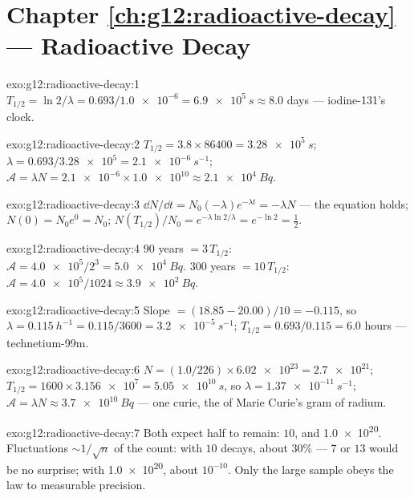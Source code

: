 \section*{Chapter \ref{ch:g12:radioactive-decay} --- Radioactive Decay}

\begin{solution}{exo:g12:radioactive-decay:1}
$T_{1/2} = \ln 2/\lambda = 0.693/\num{1.0e-6} = \qty{6.9e5}{s}
\approx 8.0$ days --- iodine-131's clock.
\end{solution}

\begin{solution}{exo:g12:radioactive-decay:2}
$T_{1/2} = 3.8 \times \num{86400} = \qty{3.28e5}{s}$;
$\lambda = 0.693/\num{3.28e5} = \qty{2.1e-6}{s^{-1}}$;
$\mathcal A = \lambda N = \num{2.1e-6} \times \num{1.0e10} \approx
\qty{2.1e4}{Bq}$.
\end{solution}

\begin{solution}{exo:g12:radioactive-decay:3}
$\dd N/\dd t = N_0(-\lambda)e^{-\lambda t} = -\lambda N$ ---
the equation holds; $N(0) = N_0 e^0 = N_0$;
$N(T_{1/2})/N_0 = e^{-\lambda \ln 2/\lambda} = e^{-\ln 2} =
\tfrac12$.
\end{solution}

\begin{solution}{exo:g12:radioactive-decay:4}
$90$ years $= 3\,T_{1/2}$: $\mathcal A = \num{4.0e5}/2^3 =
\qty{5.0e4}{Bq}$. $300$ years $= 10\,T_{1/2}$:
$\mathcal A = \num{4.0e5}/1024 \approx \qty{3.9e2}{Bq}$.
\end{solution}

\begin{solution}{exo:g12:radioactive-decay:5}
Slope $= (18.85 - 20.00)/10 = -0.115$, so
$\lambda = \qty{0.115}{h^{-1}} = 0.115/3600 = \qty{3.2e-5}{s^{-1}}$;
$T_{1/2} = 0.693/0.115 = 6.0$ hours --- technetium-99m.
\end{solution}

\begin{solution}{exo:g12:radioactive-decay:6}
$N = (1.0/226) \times \num{6.02e23} = \num{2.7e21}$;
$T_{1/2} = 1600 \times \num{3.156e7} = \qty{5.05e10}{s}$, so
$\lambda = \qty{1.37e-11}{s^{-1}}$;
$\mathcal A = \lambda N \approx \qty{3.7e10}{Bq}$ --- one curie, the
 of Marie Curie's gram of radium.
\end{solution}

\begin{solution}{exo:g12:radioactive-decay:7}
Both expect half to remain: $10$, and \num{1.0e20}. Fluctuations
$\sim 1/\sqrt{n}$ of the count: with $10$ decays, about $30\%$ ---
$7$ or $13$ would be no surprise; with \num{1.0e20}, about
$10^{-10}$. Only the large sample obeys the law to measurable
precision.
\end{solution}

